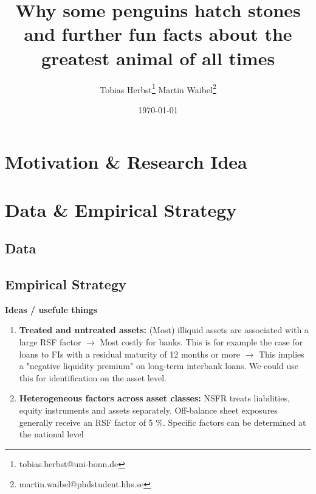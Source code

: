 \documentclass[a4paper,12pt]{article}
\title{Why some penguins hatch stones and further fun facts about the greatest animal of all times}
\author{Tobias Herbst\thanks{tobias.herbst@uni-bonn.de} \hspace{1cm}  Martin Waibel\thanks{martin.waibel@phdstudent.hhs.se} }
\date{\today}
\begin{document}
\maketitle

\begin{abstract}
\lipsum[1-1]




\end{abstract}

\clearpage
\section{Motivation \& Research Idea}
\label{motivation}


\section{Data \& Empirical Strategy}
\label{data_strategy}

\subsection{Data}
\label{data}



\subsection{Empirical Strategy}
\label{emp_strategy}

\textbf{Ideas / usefule things}
\begin{enumerate}
	\item \textbf{Treated and untreated assets:} (Most) illiquid assets are associated with a large RSF factor $\rightarrow$ Most costly for banks. This is for example the case for loans to FIs with a residual maturity of 12 months or more $\rightarrow$ This implies a "negative liquidity premium" on long-term interbank loans. We could use this for identification on the asset level.

	\item \textbf{Heterogeneous factors across asset classes:} NSFR treats liabilities, equity instruments and assets separately. Off-balance sheet exposures generally receive an RSF factor of 5 \%. Specific factors can be determined at the national level 

\end{enumerate}
\end{document}
